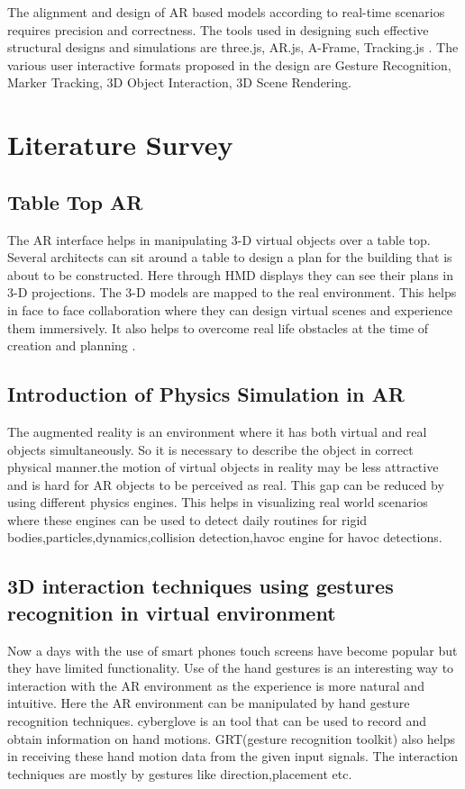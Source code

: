 \documentclass[conference]{IEEEtran}
\begin{document}
The alignment and design of AR based models according to real-time scenarios requires precision and correctness. The tools used in designing such effective structural designs and simulations are three.js, AR.js, A-Frame, Tracking.js . The various user interactive formats proposed in the design are Gesture Recognition, Marker Tracking, 3D Object Interaction, 3D Scene Rendering.
\section{Literature Survey}
\subsection{Table Top AR}
 The AR interface helps in manipulating 3-D virtual objects over a table top. Several architects can sit around a table to design a plan for the building that is about to be constructed. Here through HMD displays they can see their plans in 3-D projections. The 3-D models are mapped to the real environment. This helps in face to face collaboration where they can design virtual scenes and experience them immersively. It also helps to overcome real life obstacles at the time of creation and planning . 

\subsection{Introduction of Physics Simulation in AR}
The augmented reality is an environment where it has both virtual and real objects simultaneously. So it is necessary to describe the object in correct physical manner.the motion of virtual objects in reality may be less attractive and is hard for AR objects to be perceived as real. This gap can be reduced by using different physics engines. This helps in visualizing real world scenarios where these engines can be used to detect daily routines for rigid bodies,particles,dynamics,collision detection,havoc engine for havoc detections.

\subsection{3D interaction techniques using gestures recognition in virtual environment}
Now a days with the use of smart phones touch screens have become popular but they have limited functionality. Use of the hand gestures is an interesting way to interaction with the AR environment as the experience is more natural and intuitive. Here the AR environment can be manipulated by hand gesture recognition techniques. cyberglove is an tool that can be used to record and obtain information on hand motions. GRT(gesture recognition toolkit) also helps in receiving these hand motion data from the given input signals. The interaction techniques are mostly by gestures like direction,placement etc.
\end{document}
